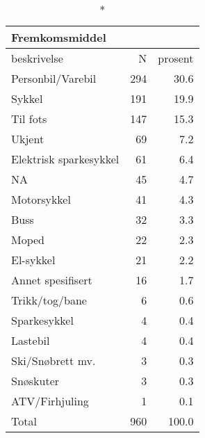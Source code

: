 \documentclass[
  letterpaper,
  DIV=11,
  numbers=noendperiod]{scrartcl}
\begin{document}
\begingroup
\fontsize{12.0pt}{14.4pt}\selectfont
\begin{longtable*}{lrr}
\caption*{
{\large Fremkomsmiddel}
} \\ 
\toprule
beskrivelse & N & prosent \\ 
\midrule\addlinespace[2.5pt]
Personbil/Varebil & 294 & 30.6 \\ 
Sykkel & 191 & 19.9 \\ 
Til fots & 147 & 15.3 \\ 
Ukjent & 69 & 7.2 \\ 
Elektrisk sparkesykkel & 61 & 6.4 \\ 
NA & 45 & 4.7 \\ 
Motorsykkel & 41 & 4.3 \\ 
Buss & 32 & 3.3 \\ 
Moped & 22 & 2.3 \\ 
El-sykkel & 21 & 2.2 \\ 
Annet spesifisert & 16 & 1.7 \\ 
Trikk/tog/bane & 6 & 0.6 \\ 
Sparkesykkel & 4 & 0.4 \\ 
Lastebil & 4 & 0.4 \\ 
Ski/Snøbrett mv. & 3 & 0.3 \\ 
Snøskuter & 3 & 0.3 \\ 
ATV/Firhjuling & 1 & 0.1 \\ 
Total & 960 & 100.0 \\ 
\bottomrule
\end{longtable*}
\endgroup
\end{document}
